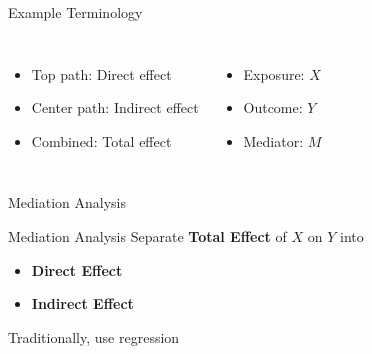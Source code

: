 \documentclass[14pt]{beamer}
\begin{document}
\begin{frame}{Example}
    Terminology
    \begin{columns}
        \begin{itemize}
            \item Top path: {Direct effect}
            \item Center path: {Indirect effect}
            \item Combined: {Total effect}
        \end{itemize}
        \begin{itemize}
            \item Exposure: $X$
            \item Outcome: $Y$
            \item Mediator: $M$
        \end{itemize}
    \end{columns}
    
\end{frame}




\begin{frame}{Mediation Analysis}
    \begin{figure}[H]
    \end{figure}
\end{frame}

\begin{frame}{Mediation Analysis}
    Separate \textbf{Total Effect} of $X$ on $Y$ into
    \begin{itemize}
        \item \textbf{Direct Effect}
        \item \textbf{Indirect Effect}\newline
    \end{itemize}

    Traditionally, use regression
\end{frame}
\end{document}
